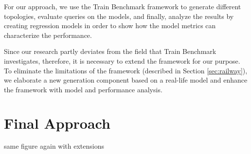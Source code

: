 For our approach, we use the Train Benchmark framework to generate different topologies, evaluate queries on the models, and finally, analyze the results by creating regression models in order to show how the model metrics can characterize the performance.

Since our research partly deviates from the field that Train Benchmark investigates, therefore, it is necessary to extend the framework for our purpose. To eliminate the limitations of the framework (described in Section \ref{sec:railway}), we elaborate a new generation component based on a real-life model and enhance the framework with model and performance analysis.

\section{Final Approach}

same figure again with extensions
